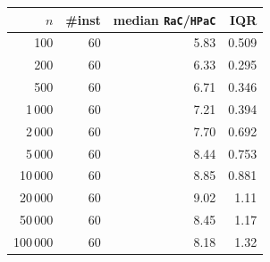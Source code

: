 \begin{tabular}{@{}rrrr@{}}
\toprule
$n$ & \#inst & median \texttt{RaC}/\texttt{HPaC} & IQR \\
\midrule
100 & 60 & 5.83 & 0.509 \\
200 & 60 & 6.33 & 0.295 \\
500 & 60 & 6.71 & 0.346 \\
1\,000 & 60 & 7.21 & 0.394 \\
2\,000 & 60 & 7.70 & 0.692 \\
5\,000 & 60 & 8.44 & 0.753 \\
10\,000 & 60 & 8.85 & 0.881 \\
20\,000 & 60 & 9.02 & 1.11 \\
50\,000 & 60 & 8.45 & 1.17 \\
100\,000 & 60 & 8.18 & 1.32 \\
\bottomrule
\end{tabular}
